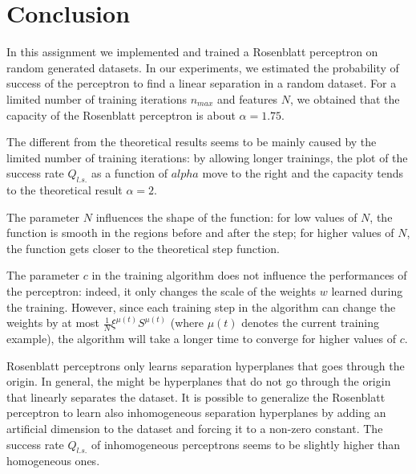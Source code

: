 \section{Conclusion}

In this assignment we implemented and trained a Rosenblatt perceptron on random generated datasets.
In our experiments, we estimated the probability of success of the perceptron to find a linear separation in a random dataset.
For a limited number of training iterations $n_{max}$ and features $N$, we obtained that the capacity of the Rosenblatt perceptron is about $\alpha = 1.75$.

The different from the theoretical results seems to be mainly caused by the limited number of training iterations:
by allowing longer trainings, the plot of the success rate $Q_{l.s.}$ as a function of $alpha$ move to the right and the capacity tends to the theoretical result $\alpha = 2$.

The parameter $N$ influences the shape of the function:
for low values of $N$, the function is smooth in the regions before and after the step;
for higher values of $N$, the function gets closer to the theoretical step function.

The parameter $c$ in the training algorithm does not influence the performances of the perceptron:
indeed, it only changes the scale of the weights $w$ learned during the training.
However, since each training step in the algorithm can change the weights by at most $\frac{1}{N}\xi^{\mu(t)} S^{\mu(t)}$ (where $\mu(t)$ denotes the current training example), the algorithm will take a longer time to converge for higher values of $c$.

Rosenblatt perceptrons only learns separation hyperplanes that goes through the origin.
In general, the might be hyperplanes that do not go through the origin that linearly separates the dataset.
It is possible to generalize the Rosenblatt perceptron to learn also inhomogeneous separation hyperplanes by adding an artificial dimension to the dataset and forcing it to a non-zero constant.
The success rate $Q_{l.s.}$ of inhomogeneous perceptrons seems to be slightly higher than homogeneous ones.
